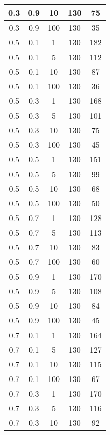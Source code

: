 \begin{appendices}
\begin{longtable}{|c|c|c|c|c|}
		0.3   & 0.9    & 10   & 130   & 75    \\ \hline
		0.3   & 0.9    & 100  & 130   & 35    \\ \hline
		0.5   & 0.1    & 1    & 130   & 182   \\ \hline
		0.5   & 0.1    & 5    & 130   & 112   \\ \hline
		0.5   & 0.1    & 10   & 130   & 87    \\ \hline
		0.5   & 0.1    & 100  & 130   & 36    \\ \hline
		0.5   & 0.3    & 1    & 130   & 168   \\ \hline
		0.5   & 0.3    & 5    & 130   & 101   \\ \hline
		0.5   & 0.3    & 10   & 130   & 75    \\ \hline
		0.5   & 0.3    & 100  & 130   & 45    \\ \hline
		0.5   & 0.5    & 1    & 130   & 151   \\ \hline
		0.5   & 0.5    & 5    & 130   & 99    \\ \hline
		0.5   & 0.5    & 10   & 130   & 68    \\ \hline
		0.5   & 0.5    & 100  & 130   & 50    \\ \hline
		0.5   & 0.7    & 1    & 130   & 128   \\ \hline
		0.5   & 0.7    & 5    & 130   & 113   \\ \hline
		0.5   & 0.7    & 10   & 130   & 83    \\ \hline
		0.5   & 0.7    & 100  & 130   & 60    \\ \hline
		0.5   & 0.9    & 1    & 130   & 170   \\ \hline
		0.5   & 0.9    & 5    & 130   & 108   \\ \hline
		0.5   & 0.9    & 10   & 130   & 84    \\ \hline
		0.5   & 0.9    & 100  & 130   & 45    \\ \hline
		0.7   & 0.1    & 1    & 130   & 164   \\ \hline
		0.7   & 0.1    & 5    & 130   & 127   \\ \hline
		0.7   & 0.1    & 10   & 130   & 115   \\ \hline
		0.7   & 0.1    & 100  & 130   & 67    \\ \hline
		0.7   & 0.3    & 1    & 130   & 170   \\ \hline
		0.7   & 0.3    & 5    & 130   & 116   \\ \hline
		0.7   & 0.3    & 10   & 130   & 92    \\ \hline

\end{longtable}
\end{appendices}
